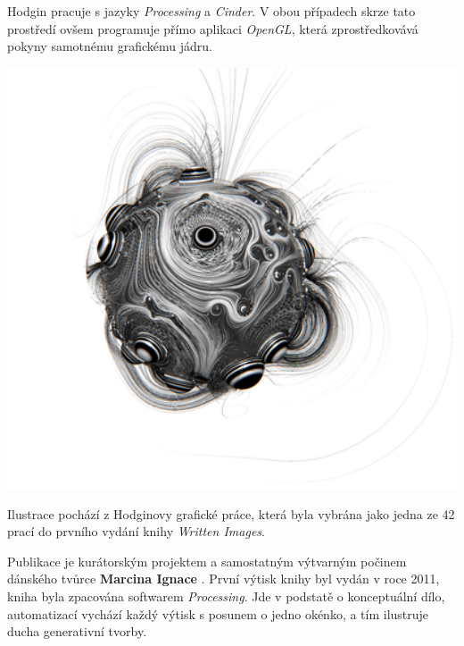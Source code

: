 \documentclass[10pt,twoside=true,open=right,cleardoublepage=empty,chapterprefix=true]{scrbook}
\begin{document}
Hodgin pracuje s jazyky {\em Processing} a {\em Cinder}. V obou případech skrze tato prostředí ovšem programuje přímo aplikaci {\em OpenGL}, která zprostředkovává pokyny samotnému grafickému jádru.

\vfill

\begin{centering}
\includegraphics[width = 1\textwidth]{imgs/hogin.png}
\end{centering}

Ilustrace pochází z Hodginovy   grafické práce, která byla vybrána jako jedna ze 42 prací do prvního vydání knihy {\em Written Images}.

Publikace je kurátorským projektem a samostatným výtvarným počinem dánského tvůrce \textbf{Marcina Ignace} . První výtisk knihy byl vydán v roce 2011, kniha byla zpacována softwarem {\em Processing}. Jde v podstatě o konceptuální dílo, automatizací vychází každý výtisk s posunem o jedno okénko, a tím ilustruje ducha generativní tvorby. \vfill
\end{document}
